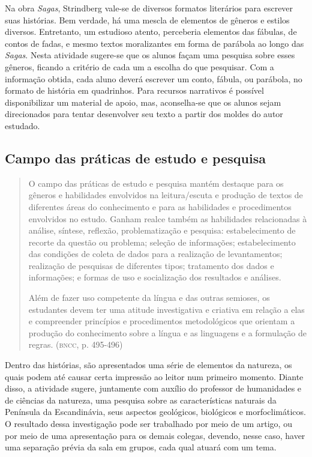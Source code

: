 \documentclass[12pt]{extarticle}
\begin{document}
Na obra \emph{Sagas}, Strindberg vale-se de diversos formatos
literários para escrever suas histórias. Bem verdade, há uma mescla de
elementos de gêneros e estilos diversos. Entretanto, um estudioso
atento, perceberia elementos das fábulas, de contos de fadas, e mesmo
textos moralizantes em forma de parábola ao longo das \emph{Sagas}.
Nesta atividade sugere-se que os alunos façam uma pesquisa sobre esses
gêneros, ficando a critério de cada um a escolha do que pesquisar. Com
a informação obtida, cada aluno deverá escrever um conto, fábula, ou
parábola, no formato de história em quadrinhos. Para recursos
narrativos é possível disponibilizar um material de apoio, mas,
aconselha-se que os alunos sejam direcionados para tentar desenvolver
seu texto a partir dos moldes do autor estudado.

\subsection{Campo das práticas de estudo e pesquisa}

\begin{quote}
O campo das práticas de estudo e pesquisa mantém destaque para os
gêneros e habilidades envolvidos na leitura/escuta e produção de textos
de diferentes áreas do conhecimento e para as habilidades e
procedimentos envolvidos no estudo. Ganham realce também as habilidades
relacionadas à análise, síntese, reflexão, problematização e pesquisa:
estabelecimento de recorte da questão ou problema; seleção de
informações; estabelecimento das condições de coleta de dados para a
realização de levantamentos; realização de pesquisas de diferentes
tipos; tratamento dos dados e informações; e formas de uso e
socialização dos resultados e análises.

Além de fazer uso competente da língua e das outras semioses, os
estudantes devem ter uma atitude investigativa e criativa em relação a
elas e compreender princípios e procedimentos metodológicos que orientam
a produção do conhecimento sobre a língua e as linguagens e a formulação
de regras. (\textsc{bncc}, p. 495-496)
\end{quote}

Dentro das histórias, são apresentados uma série de elementos da
natureza, os quais podem até causar certa impressão ao leitor num
primeiro momento. Diante disso, a atividade sugere, juntamente com
auxílio do professor de humanidades e de ciências da natureza, uma
pesquisa sobre as características naturais da Península da
Escandinávia, seus aspectos geológicos, biológicos e morfoclimáticos.
O resultado dessa investigação pode ser trabalhado por meio de um
artigo, ou por meio de uma apresentação para os demais colegas,
devendo, nesse caso, haver uma separação prévia da sala em grupos,
cada qual atuará com um tema.
\end{document}
